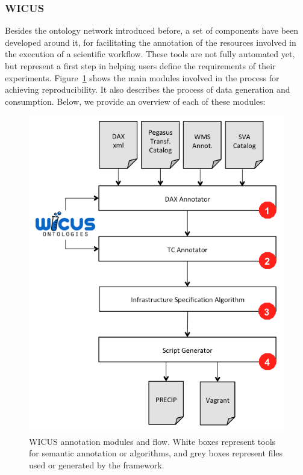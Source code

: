 \subsubsection{WICUS}
\label{subsec:wicus}

Besides the ontology network introduced before, a set of components have been developed around it, 
for facilitating the annotation of the resources involved in the execution of a scientific workflow. 
These tools are not fully automated yet, but represent a first step in helping users define the requirements of their 
experiments. Figure~\ref{fig:wicusflow} shows the main modules involved in the process for achieving reproducibility. 
It also describes the process of data generation and consumption. Below, we provide an overview of each of these modules:

\begin{figure}[!htb]
	\centering
	\includegraphics[width=.8\linewidth]{figures/wicusflow}
	\caption{WICUS annotation modules and flow. White boxes represent tools for semantic annotation or algorithms, and grey boxes represent files used or generated by the framework.}
	\label{fig:wicusflow}
\end{figure}

